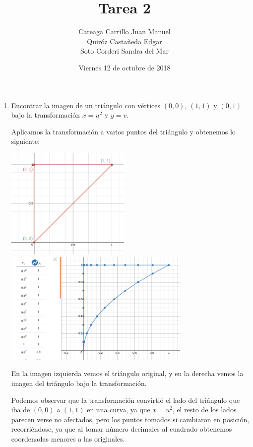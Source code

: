 \documentclass{article}
\begin{document}
    \title{Tarea 2}
    \author{Careaga Carrillo Juan Manuel\\
            Quiróz Castañeda Edgar\\
            Soto Corderi Sandra del Mar}
    \date{Viernes 12 de octubre de 2018}
    \maketitle
    \begin{enumerate}

        \item {
            Encontrar la imagen de un triángulo con vértices $(0,0)$, $(1,1)$
            y $(0,1)$ bajo la transformación $x=u^2$ y $y=v$.

            \color{azul}
          Aplicamos la transformación a varios puntos del triángulo y obtenemos lo siguiente:
            \begin{center}
                \includegraphics[width=6cm]{img/ejercicio1-1.png}
                \hspace{.5cm}
                \includegraphics[width=9cm]{img/ejercicio1-2.png}
        	\end{center}
            En la imagen izquierda vemos el triángulo original, y en la derecha
            vemos la imagen del triángulo bajo la transformación.
            
            Podemos observar que la transformación convirtió el lado del triángulo que iba de $(0,0)$ a $(1,1)$ en una curva, ya que $x=u^2$, el resto de los lados parecen verse no afectados, pero los puntos tomados si cambiaron en posición, recorriéndose, ya que al tomar número decimales al cuadrado obtenemos coordenadas menores a las originales.
	    }


\end{enumerate}
\end{document}
